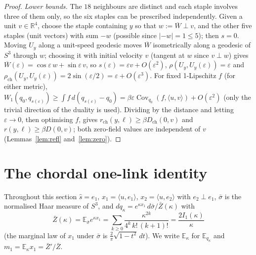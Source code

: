 \documentclass[11pt,a4paper]{article}
\theoremstyle{remark}
\theoremstyle{definition}
\newcommand{\R}{\mathbb{R}}
\newcommand{\E}{\mathbb{E}}
\newcommand{\Cov}{\operatorname{Cov}}
\newcommand{\Zb}{\bar Z}
\newcommand{\Dch}{D_{\mathrm{ch}}}
\newcommand{\rch}{\rho_{\mathrm{ch}}}
\begin{document}
\begin{proof}
\emph{Lower bounds.} The $18$ neighbours are distinct and each staple involves three of them only, so the
six staples can be prescribed independently. Given a unit $v\in\R^4$, choose the staple containing $y$ so
that $w:=\overline{W}\perp v$, and the other five staples (unit vectors) with sum $-w$ (possible since
$|{-w}|=1\le5$); then $s=0$. Moving $U_y$ along a unit-speed geodesic moves $\overline W$ isometrically along
a geodesic of $S^3$ through $w$; choosing it with initial velocity $v$ (tangent at $w$ since $v\perp w$)
gives $\overline W(\varepsilon)=\cos\varepsilon\,w+\sin\varepsilon\,v$, so $s(\varepsilon)=\varepsilon v+O(\varepsilon^2)$,
$\rho(U_y,U_y(\varepsilon))=\varepsilon$ and $\rch(U_y,U_y(\varepsilon))=2\sin(\varepsilon/2)=\varepsilon+O(\varepsilon^3)$.
For fixed 1-Lipschitz $f$ (for either metric),
$W_1(q_0,q_{s(\varepsilon)})\ge\int f\,d(q_{s(\varepsilon)}-q_0)=\beta\varepsilon\Cov_{q_0}(f,\langle u,v\rangle)
+O(\varepsilon^2)$ (only the trivial direction of the duality is used). Dividing by the distance and
letting $\varepsilon\to0$, then optimising $f$, gives $r_{\mathrm{ch}}(y,\ell)\ge\beta\Dch(0,v)$ and
$r(y,\ell)\ge\beta D(0,v)$; both zero-field values are independent of $v$ (Lemmas~\ref{lem:refl}
and~\ref{lem:zero}).
\end{proof}

\section{The chordal one-link identity}\label{sec:chordal}

Throughout this section $\hat s=e_1$, $x_1=\langle u,e_1\rangle$, $x_2=\langle u,e_2\rangle$ with $e_2\perp e_1$,
$\bar\sigma$ is the normalised Haar measure of $S^3$, and $dq_\kappa=e^{\kappa x_1}\,d\bar\sigma/\Zb(\kappa)$ with
\[
\Zb(\kappa)=\E_{\bar\sigma}e^{\kappa x_1}=\sum_{k\ge0}\frac{\kappa^{2k}}{4^k\,k!\,(k+1)!}=\frac{2I_1(\kappa)}{\kappa}
\]
(the marginal law of $x_1$ under $\bar\sigma$ is $\frac2\pi\sqrt{1-t^2}\,dt$). We write $\E_\kappa$ for $\E_{q_\kappa}$
and $m_1=\E_\kappa x_1=\Zb'/\Zb$.
\end{document}
